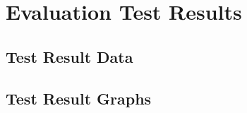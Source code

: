 \section{Evaluation Test Results} %
\label{sec:test_results}

\subsection{Test Result Data} %
\label{sub:test_result_data}


\subsection{Test Result Graphs} %
\label{sub:test_result_graphs}


